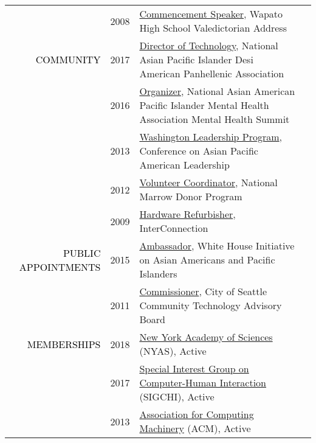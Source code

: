 \documentclass[12pt]{article}
\begin{document}
{{\begin{longtable}{Rp{1.0in}p{0.25in}p{4.75in}}
& \footnotesize{2008} & \href{https://youtu.be/5gt7nFRgkac}{{Commencement Speaker}}, Wapato High School Valedictorian Address \\

\textcolor{black}{\footnotesize{\uppercase{Community}}} & \footnotesize{2017} & \href{http://napahq.org}{{Director of Technology}}, National Asian Pacific Islander Desi American Panhellenic Association \\

& \footnotesize{2016} & \href{https://www.facebook.com/events/215634702135825/}{{Organizer}}, National Asian American Pacific Islander Mental Health Association Mental Health Summit \\

& \footnotesize{2013} & \href{http://www.capal.org/programs/wlp/}{{Washington Leadership Program}}, Conference on Asian Pacific American Leadership \\

& \footnotesize{2012} & \href{http://www.dailyuw.com/news/article_de3524ce-3d5e-5dd2-8de7-5deebee463d9.html}{{Volunteer Coordinator}}, National Marrow Donor Program \\

& \footnotesize{2009} & \href{http://www.washington.edu/news/2010/04/22/student-service-and-leadership-to-be-celebrated-april-28/}{{Hardware Refurbisher}}, InterConnection \\

\textcolor{black}{\footnotesize{\uppercase{Public Appointments}}} & \footnotesize{2015} & \href{http://sites.ed.gov/aapi/e3-ambassadors/}{{Ambassador}}, White House Initiative on Asian Americans and Pacific Islanders \\

& \footnotesize{2011} & \href{https://web.archive.org/web/20150911093548/https://ischool.uw.edu/alumni/impact-stories/informatics-grad-and-husky-promise-student-aims-deliver-it-resources}{{Commissioner}}, City of Seattle Community Technology Advisory Board \\

\textcolor{black}{\footnotesize{\uppercase{Memberships}}} & \footnotesize{2018} & \href{https://www.nyas.org/}{{New York Academy of Sciences}} (NYAS), Active \\

 & \footnotesize{2017} & \href{http://www.sigchi.org/}{{Special Interest Group on Computer-Human Interaction}} (SIGCHI), Active \\

& \footnotesize{2013} & \href{https://www.acm.org/}{{Association for Computing Machinery}} (ACM), Active \\


\end{longtable}}}
\end{document}
